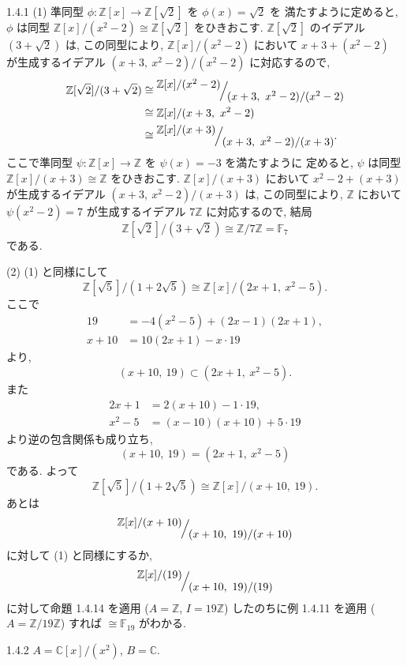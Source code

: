 \begin{ans}{1.4.1}
  (1) 準同型 $\phi \colon \mathbb{Z}[x] \to \mathbb{Z}[\sqrt{2}]$ を $\phi(x) = \sqrt{2}$ を
  満たすように定めると, $\phi$ は同型
  $\mathbb{Z}[x]/(x^2 - 2) \cong \mathbb{Z}[\sqrt{2}]$ をひきおこす.
  $\mathbb{Z}[\sqrt{2}]$ のイデアル $(3 + \sqrt{2})$ は, この同型により,
  $\mathbb{Z}[x]/(x^2 - 2)$ において $x + 3 + (x^2 - 2)$ が生成するイデアル
  $(x + 3,\ x^2 - 2)/(x^2 - 2)$ に対応するので,
  \begin{align*}
    \mathbb{Z}[\sqrt{2}]/(3 + \sqrt{2})
    &\cong \nestquot{\mathbb{Z}[x]/(x^2 - 2)}{(x + 3,\ x^2 - 2)/(x^2 - 2)} \\
    &\cong \mathbb{Z}[x]/(x + 3,\ x^2 - 2) \\
    &\cong \nestquot{\mathbb{Z}[x]/(x + 3)}{(x + 3,\ x^2 - 2)/(x + 3)}.
  \end{align*}
  ここで準同型 $\psi \colon \mathbb{Z}[x] \to \mathbb{Z}$ を $\psi(x) = -3$ を満たすように
  定めると, $\psi$ は同型 $\mathbb{Z}[x]/(x + 3) \cong \mathbb{Z}$ をひきおこす.
  $\mathbb{Z}[x]/(x + 3)$ において $x^2 - 2 + (x + 3)$ が生成するイデアル
  $(x + 3,\ x^2 - 2)/(x + 3)$ は, この同型により, $\mathbb{Z}$ において
  $\psi(x^2 - 2) = 7$ が生成するイデアル $7\mathbb{Z}$ に対応するので, 結局
  \[
    \mathbb{Z}[\sqrt{2}]/(3 + \sqrt{2}) \cong \mathbb{Z}/7\mathbb{Z} = \mathbb{F}_7
  \]
  である.

  \medskip
  (2) (1) と同様にして
  \[
    \mathbb{Z}[\sqrt{5}]/(1 + 2\sqrt{5}) \cong \mathbb{Z}[x]/(2x + 1,\ x^2 - 5).
  \]
  ここで
  \begin{align*}
    19 &= -4(x^2 - 5) + (2x - 1)(2x + 1), \\
    x + 10 &= 10(2x + 1) - x \cdot 19
  \end{align*}
  より,
  \[
    (x + 10,\ 19) \subset (2x + 1,\ x^2 - 5).
  \]
  また
  \begin{align*}
    2x + 1 &= 2(x + 10) - 1 \cdot 19, \\
    x^2 - 5 &= (x - 10)(x + 10) + 5 \cdot 19
  \end{align*}
  より逆の包含関係も成り立ち,
  \[
    (x + 10,\ 19) = (2x + 1,\ x^2 - 5)
  \]
  である. よって
  \[
    \mathbb{Z}[\sqrt{5}]/(1 + 2\sqrt{5}) \cong \mathbb{Z}[x]/(x + 10,\ 19).
  \]
  あとは
  \[
    \nestquot{\mathbb{Z}[x]/(x + 10)}{(x + 10,\ 19)/(x + 10)}
  \]
  に対して (1) と同様にするか,
  \[
    \nestquot{\mathbb{Z}[x]/(19)}{(x + 10,\ 19)/(19)}
  \]
  に対して命題 1.4.14 を適用 ($A = \mathbb{Z}$, $I = 19\mathbb{Z}$)
  したのちに例 1.4.11 を適用 ($A = \mathbb{Z}/19\mathbb{Z}$) すれば
  $\cong \mathbb{F}_{19}$ がわかる.
\end{ans}

\begin{ans}{1.4.2}
  $A = \mathbb{C}[x]/(x^2)$, $B = \mathbb{C}$.
\end{ans}


